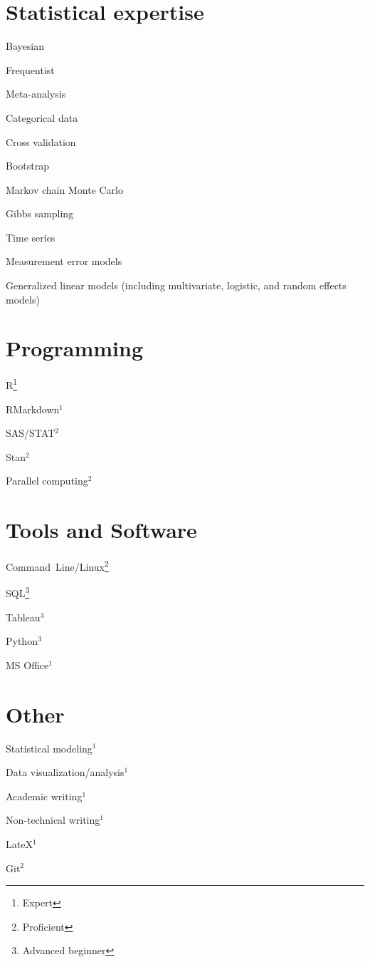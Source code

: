 \documentclass[letterpaper]{resume_config}
\begin{document}
\section{Statistical expertise}
\begin{SkillsList}
	\item Bayesian 
	\item Frequentist   	
	\item Meta-analysis
	\item Categorical data  
	\item Cross validation 
	\item Bootstrap 
	\item Markov chain Monte Carlo 
	\item Gibbs sampling 
	\item Time series 
	\item Measurement error models
	\item Generalized linear models (including multivariate, logistic, and random effects models)   
\end{SkillsList}

\section{Programming}
\begin{SkillsList}
    \item R\footnote{Expert} 
    \item RMarkdown$^1$
    \item SAS/STAT$^2$
    \item Stan$^2$
    \item Parallel computing$^2$
\end{SkillsList}

\section{Tools and Software}
\begin{SkillsList}
    \item Command~Line/Linux\footnote{Proficient} 
    \item SQL\footnote{Advanced beginner} 
    \item Tableau$^3$
    \item Python$^3$
    \item MS Office$^1$
\end{SkillsList}

\section{Other}
\begin{SkillsList}
    \item Statistical modeling$^1$
    \item Data visualization/analysis$^1$ 
    \item Academic writing$^1$
    \item Non-technical writing$^1$
    \item LateX$^1$ 
    \item Git$^2$
\end{SkillsList}
\end{document}
